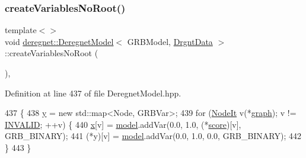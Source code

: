 \mbox{\label{classderegnet_1_1DeregnetModel_aefb0e4b6a3fc7ff0dd6beffc9d826f1d}} 
\subsubsection{\texorpdfstring{create\+Variables\+No\+Root()}{createVariablesNoRoot()}\hspace{0.1cm}{\footnotesize\ttfamily [2/3]}}
{\footnotesize\ttfamily template$<$$>$ \\
void \hyperlink{classderegnet_1_1DeregnetModel}{deregnet\+::\+Deregnet\+Model}$<$ G\+R\+B\+Model, \hyperlink{classderegnet_1_1DrgntData}{Drgnt\+Data} $>$\+::create\+Variables\+No\+Root (\begin{DoxyParamCaption}{ }\end{DoxyParamCaption})\hspace{0.3cm}{\ttfamily [inline]}, {\ttfamily [private]}}



Definition at line 437 of file Deregnet\+Model.\+hpp.


\begin{DoxyCode}
437                                                                \{
438     \hyperlink{classderegnet_1_1DeregnetModel_ae76df61afe302b939165facf3dd21ac8}{y} = \textcolor{keyword}{new} std::map<Node, GRBVar>;
439     \textcolor{keywordflow}{for} (\hyperlink{namespacederegnet_ac34314e1b5f456fc6d1bb9d96316de4a}{NodeIt} v(*\hyperlink{classderegnet_1_1DeregnetModel_a3cd2f54b8e061ef5bed32708d9bc1ef1}{graph}); v != \hyperlink{usinglemon_8hpp_adf770fe2eec438e3758ffe905dbae208}{INVALID}; ++v) \{
440         \hyperlink{classderegnet_1_1DeregnetModel_a360c980f3fec4dfbab50e9bb06a933a8}{x}[v] = \hyperlink{classderegnet_1_1DeregnetModel_a30d525de2086e342b33fe3e45ede4947}{model}.addVar(0.0, 1.0, (*\hyperlink{classderegnet_1_1DeregnetModel_a46224b0bda5bab796d3b7cb41c184a4d}{score})[v], GRB\_BINARY);
441         (*y)[v] = \hyperlink{classderegnet_1_1DeregnetModel_a30d525de2086e342b33fe3e45ede4947}{model}.addVar(0.0, 1.0, 0.0, GRB\_BINARY);
442     \}
443 \}
\end{DoxyCode}
\mbox{\label{classderegnet_1_1DeregnetModel_ab0653fa747e69cd61b0721440dc57552}} 
